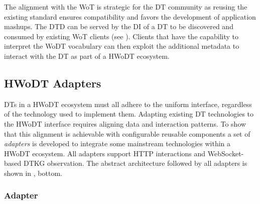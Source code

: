 



The alignment with the \ac{WoT} is strategic for the \ac{DT} community as reusing the existing standard ensures compatibility and favors the development of application mashups.
%
The \ac{DTD} can be served by the \ac{DI} of a \ac{DT} to be discovered and consumed by existing \ac{WoT} clients (see ).
%
Clients that have the capability to interpret the \ac{WoDT} vocabulary can then exploit the additional metadata to interact with the \ac{DT} as part of a \ac{HWoDT} ecosystem.%

\subsection{HWoDT Adapters}
\label{ssec:adapters}

\acp{DT} in a \ac{HWoDT} ecosystem must all adhere to the uniform interface, regardless of the technology used to implement them.
%
Adapting existing \ac{DT} technologies to the \ac{HWoDT} interface requires aligning data and interaction patterns.
%
To show that this alignment is achievable with configurable reusable components a set of \emph{adapters} is developed to integrate some mainstream technologies within a \ac{HWoDT} ecosystem.
%
All adapters support HTTP interactions and WebSocket-based \ac{DTKG} observation.
%
The abstract architecture followed by all adapters is shown in , bottom.

\subsubsection{\azureTwin{} Adapter}


